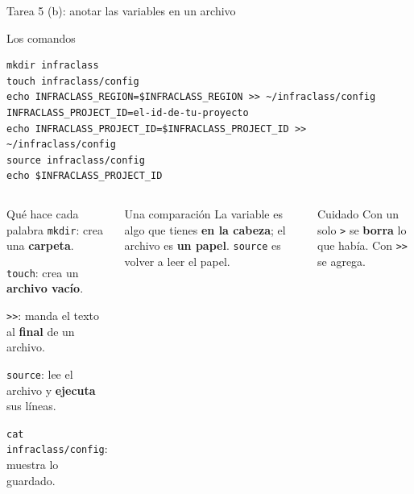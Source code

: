 \documentclass[aspectratio=169,10pt,c]{beamer}
\begin{document}
\begin{frame}[fragile]{Tarea 5 (b): anotar las variables en un archivo}
\begin{block}{Los comandos}
\begin{lstlisting}[basicstyle=\ttfamily\footnotesize]
mkdir infraclass
touch infraclass/config
echo INFRACLASS_REGION=$INFRACLASS_REGION >> ~/infraclass/config
INFRACLASS_PROJECT_ID=el-id-de-tu-proyecto
echo INFRACLASS_PROJECT_ID=$INFRACLASS_PROJECT_ID >> ~/infraclass/config
source infraclass/config
echo $INFRACLASS_PROJECT_ID
\end{lstlisting}
\end{block}
\begin{columns}[T,onlytextwidth]
\begin{block}{Qué hace cada palabra}
\small
\texttt{mkdir}: crea una \textbf{carpeta}.\par
\texttt{touch}: crea un \textbf{archivo vacío}.\par
\texttt{>>}: manda el texto al \textbf{final} de un archivo.\par
\texttt{source}: lee el archivo y \textbf{ejecuta} sus líneas.\par
\texttt{cat infraclass/config}: muestra lo guardado.
\end{block}
\begin{exampleblock}{Una comparación}
\small La variable es algo que tienes \textbf{en la cabeza}; el archivo es \textbf{un papel}. \texttt{source} es volver a leer el papel.
\end{exampleblock}
\begin{alertblock}{Cuidado}
\small Con un solo \texttt{>} se \textbf{borra} lo que había. Con \texttt{>>} se agrega.
\end{alertblock}
\end{columns}
\end{frame}
\end{document}
